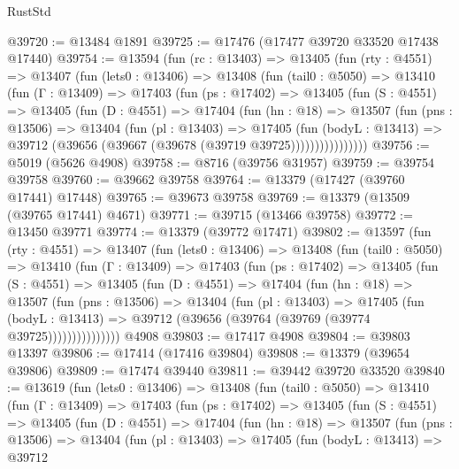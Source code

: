 \begin{lexlean}{RustStd}
\begin{coremodule}
@39720 := @13484 @1891
@39725 := @17476 (@17477 @39720 @33520 @17438 @17440)
@39754 := @13594
    (fun (rc : @13403) =>
    @13405
      (fun (rty : @4551) =>
      @13407
        (fun (lets0 : @13406) =>
        @13408
          (fun (tail0 : @5050) =>
          @13410
            (fun (Γ : @13409) =>
            @17403
              (fun (ps : @17402) =>
              @13405
                (fun (S : @4551) =>
                @13405
                  (fun (D : @4551) =>
                  @17404
                    (fun (hn : @18) =>
                    @13507
                      (fun (pns : @13506) =>
                      @13404
                        (fun (pl : @13403) =>
                        @17405
                          (fun (bodyL : @13413) =>
                          @39712 (@39656 (@39667 (@39678 (@39719 @39725))))))))))))))))
@39756 := @5019 (@5626 @4908)
@39758 := @8716 (@39756 @31957)
@39759 := @39754 @39758
@39760 := @39662 @39758
@39764 := @13379 (@17427 (@39760 @17441) @17448)
@39765 := @39673 @39758
@39769 := @13379 (@13509 (@39765 @17441) @4671)
@39771 := @39715 (@13466 @39758)
@39772 := @13450 @39771
@39774 := @13379 (@39772 @17471)
@39802 := @13597
    (fun (rty : @4551) =>
    @13407
      (fun (lets0 : @13406) =>
      @13408
        (fun (tail0 : @5050) =>
        @13410
          (fun (Γ : @13409) =>
          @17403
            (fun (ps : @17402) =>
            @13405
              (fun (S : @4551) =>
              @13405
                (fun (D : @4551) =>
                @17404
                  (fun (hn : @18) =>
                  @13507
                    (fun (pns : @13506) =>
                    @13404
                      (fun (pl : @13403) =>
                      @17405
                        (fun (bodyL : @13413) =>
                        @39712 (@39656 (@39764 (@39769 (@39774 @39725)))))))))))))))
    @4908
@39803 := @17417 @4908
@39804 := @39803 @13397
@39806 := @17414 (@17416 @39804)
@39808 := @13379 (@39654 @39806)
@39809 := @17474 @39440
@39811 := @39442 @39720 @33520
@39840 := @13619
    (fun (lets0 : @13406) =>
    @13408
      (fun (tail0 : @5050) =>
      @13410
        (fun (Γ : @13409) =>
        @17403
          (fun (ps : @17402) =>
          @13405
            (fun (S : @4551) =>
            @13405
              (fun (D : @4551) =>
              @17404
                (fun (hn : @18) =>
                @13507
                  (fun (pns : @13506) =>
                  @13404
                    (fun (pl : @13403) =>
                    @17405
                      (fun (bodyL : @13413) =>
                      @39712

\end{coremodule}
\end{lexlean}
